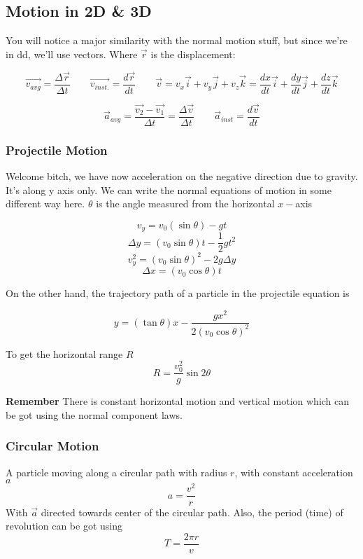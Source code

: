 \documentclass{article}
\begin{document}
\newpage

\subsection{Motion in 2D \& 3D}

You will notice a major similarity with the normal motion stuff, but since we're in dd, we'll use vectors. Where $ \vec{ r } $ is the displacement:

\[
	\vec{ v_{avg} } = \frac{ \varDelta \vec{ r } }{ \varDelta t } 
	\qquad  
	\vec{ v_{inst.} } = \frac{ d \vec{ r } }{ dt } \qquad \vec{ v } = v_x \vec{ i } + v_y \vec{ j } + v_z \vec{ k } = \frac{dx}{dt} \vec{ i } + \frac{dy}{dt} \vec{ j } + \frac{dz}{dt} \vec{ k }
\]

\[
	\vec{ a }_{avg} = \frac{ \vec{ v_2 } -  \vec{ v_1} } { \varDelta t	 } = \frac{ \varDelta	\vec{ v } }{ \varDelta t }
	\qquad \vec{ a }_{inst} = \frac{ d \vec{ v } }{ dt } 
\]

\subsubsection{Projectile Motion}
Welcome bitch, we have now acceleration on the negative direction due to gravity. It's along y axis only. We can write the normal equations of motion in some different way here. $ \theta $ is the angle measured from the horizontal $ x-$axis 

\[	v_y = v_0 ( \sin{ \theta }  ) - g t \]
\[	\varDelta y = (v_0 \sin{\theta}) t - \frac{ 1 }{ 2 } g t^2 \]
\[ v_y^2 = (v_0 \sin{\theta})^2 - 2 g \varDelta y \]
\[
	\varDelta x = (v_0 \cos{\theta}) t	
\]

On the other hand, the trajectory path of a particle in the projectile equation is

\[
	y = ( \tan{ \theta } )x - \frac{ gx^2 }{ 2(v_0 \cos{ \theta } )^2  } 
\]

To get the horizontal range $R$ 
\[
	R = \frac{ v_0^2 }{g  } \sin{ 2 \theta }  
\]

\textbf{Remember} There is constant horizontal motion and vertical motion which can be got using the normal component laws. 

\subsubsection{Circular Motion}

A particle moving along a circular path with radius $ r $, with constant acceleration $a $
\[
	a = \frac{v^2}{r}
\]
With $ \vec{ a } $ directed towards center  of the circular path. Also, the period (time) of revolution can be got using 
\[
	T = \frac{ 2 \pi r }{v}
\]
\end{document}
